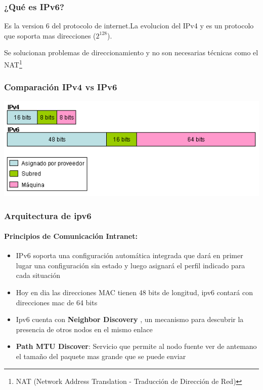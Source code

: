 \documentclass{beamer}
\begin{document}
\begin{frame}
\frametitle{¿Qué es IPv6?}

Es la version 6 del protocolo de internet.La evolucion del IPv4 y es un protocolo que soporta mas direcciones ($2^{128}$).\vspace{0.3cm}
\par Se solucionan problemas de direccionamiento y no son necesarias técnicas como el NAT\footnote{NAT (Network Address Translation - Traducción de Dirección de Red)}
\end{frame}

\begin{frame}
\frametitle{Comparación IPv4 vs IPv6}

\includegraphics[scale=0.87]{estructura_direccion.png}

\end{frame}

\begin{frame}
 \frametitle{Arquitectura de ipv6}
  \framesubtitle{\large{\vspace*{0,3cm}Principios de Comunicación\textbf{ Intranet}: \textbf{}}}
   \begin{itemize}
	\item IPv6 soporta una configuración automática integrada que dará en primer lugar una configuración sin estado y 	luego asignará el perfil indicado para cada situación
	\item Hoy en dia las direcciones MAC tienen 48 bits de longitud, ipv6 contará con direcciones mac de 64 bits
	\item Ipv6 cuenta con\textbf{ Neighbor Discovery} , un mecanismo para descubrir la presencia  de otros nodos en 		el mismo enlace
	\item\textbf{ Path MTU Discover}: Servicio que permite al nodo fuente ver de antemano el tamaño del paquete 			mas grande que se puede enviar
\end{itemize}
\end{frame}
\end{document}
